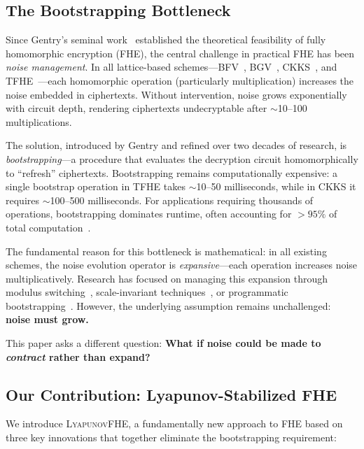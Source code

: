 \documentclass[11pt,a4paper]{article}
\begin{document}
\subsection{The Bootstrapping Bottleneck}

Since Gentry's seminal work~\cite{gentry2009} established the theoretical feasibility of fully homomorphic encryption (FHE), the central challenge in practical FHE has been \emph{noise management}. In all lattice-based schemes—BFV~\cite{bfv2012}, BGV~\cite{bgv2014}, CKKS~\cite{ckks2017}, and TFHE~\cite{tfhe2016}—each homomorphic operation (particularly multiplication) increases the noise embedded in ciphertexts. Without intervention, noise grows exponentially with circuit depth, rendering ciphertexts undecryptable after $\sim$10--100 multiplications.

The solution, introduced by Gentry and refined over two decades of research, is \emph{bootstrapping}—a procedure that evaluates the decryption circuit homomorphically to ``refresh'' ciphertexts. Bootstrapping remains computationally expensive: a single bootstrap operation in TFHE takes $\sim$10--50 milliseconds, while in CKKS it requires $\sim$100--500 milliseconds. For applications requiring thousands of operations, bootstrapping dominates runtime, often accounting for $>95\%$ of total computation~\cite{ducas2015, chillotti2021}.

The fundamental reason for this bottleneck is mathematical: in all existing schemes, the noise evolution operator is \emph{expansive}—each operation increases noise multiplicatively. Research has focused on managing this expansion through modulus switching~\cite{bgv2014}, scale-invariant techniques~\cite{brakerski2012}, or programmatic bootstrapping~\cite{chillotti2021}. However, the underlying assumption remains unchallenged: \textbf{noise must grow.}

This paper asks a different question: \textbf{What if noise could be made to \emph{contract} rather than expand?}

\subsection{Our Contribution: Lyapunov-Stabilized FHE}

We introduce \textsc{LyapunovFHE}, a fundamentally new approach to FHE based on three key innovations that together eliminate the bootstrapping requirement:
\end{document}
